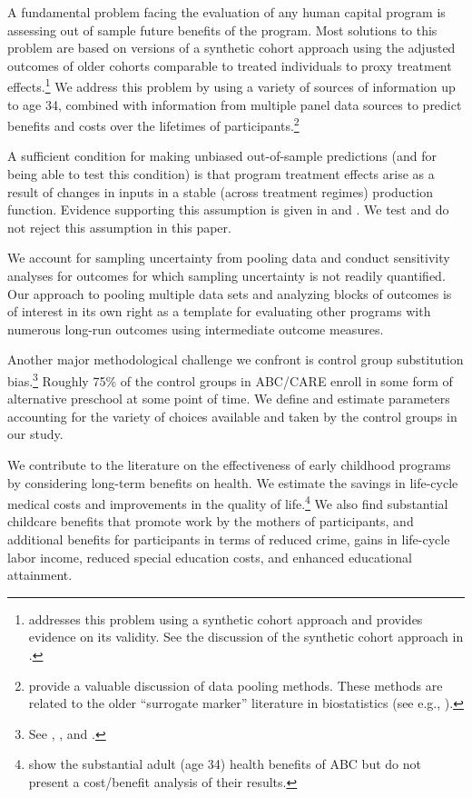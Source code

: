A fundamental problem facing the evaluation of any human capital program is assessing out of sample future benefits of the program. Most solutions to this problem are based on versions of a synthetic cohort approach using the adjusted outcomes of older cohorts comparable to treated individuals to proxy treatment effects.\footnote{\cite{Mincer_1974_schooling} addresses this problem using a synthetic cohort approach and provides evidence on its validity. See the discussion of the synthetic cohort approach in \cite{Heckman_Lochner_ea_2006_HEE}.} We address this problem by using a variety of sources of information up to age 34, combined with information from multiple panel data sources to predict benefits and costs over the lifetimes of participants.\footnote{\citet{Ridder_Moffitt_2007_hbk_metricsdata} provide a valuable discussion of data pooling methods. These methods are related to the older ``surrogate marker'' literature in biostatistics (see e.g., \citealp{Prentice_1989_Surrogate_SiM}).}

A sufficient condition for making unbiased out-of-sample predictions (and for being able to test this condition) is that program treatment effects arise as a result of changes in inputs in a stable (across treatment regimes) production function. Evidence supporting this assumption is given in \citet{Heckman_Pinto_etal_2013_PerryFactor} and \cite{Attanasio-etal_2015_NBER_Estimating-Production}. We test and do not reject this assumption in this paper.

We account for sampling uncertainty from pooling data and conduct sensitivity analyses for outcomes for which sampling uncertainty is not readily quantified. Our approach to pooling multiple data sets and analyzing blocks of outcomes is of interest in its own right as a template for evaluating other programs with numerous long-run outcomes using intermediate outcome measures.

Another major methodological challenge we confront is control group substitution bias.\footnote{See \cite{Heckman_1992_randomization}, \cite{Heckman_Hohmann_etal_2000_QJE}, and \cite{Kline_Walters_2016_QJE}.} Roughly 75\% of the control groups in ABC/CARE enroll in some form of alternative preschool at some point of time. We define and estimate parameters accounting for the variety of choices available and taken by the control groups in our study.

We contribute to the literature on the effectiveness of early childhood programs by considering long-term benefits on health. We estimate the savings in life-cycle medical costs and improvements in the quality of life.\footnote{\cite{Campbell_Conti_etal_2014_EarlyChildhoodInvestments} show the substantial adult (age 34) health benefits of ABC but do not present a cost/benefit analysis of their results.} We also find substantial childcare benefits that promote work by the mothers of participants, and additional benefits for participants in terms of reduced crime, gains in life-cycle labor income, reduced special education costs, and enhanced educational attainment.

